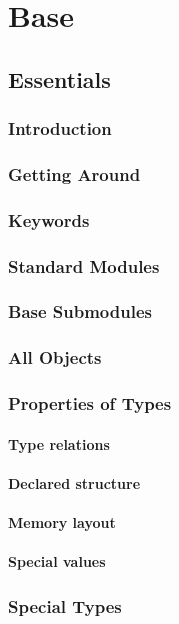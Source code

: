\part{Base}
  \chapter{Essentials}
    \section{Introduction}
    \section{Getting Around}
    \section{Keywords}
    \section{Standard Modules}
    \section{Base Submodules}
    \section{All Objects}
    \section{Properties of Types}
    \subsection{Type relations}
    \subsection{Declared structure}
    \subsection{Memory layout}
    \subsection{Special values}
    \section{Special Types}

